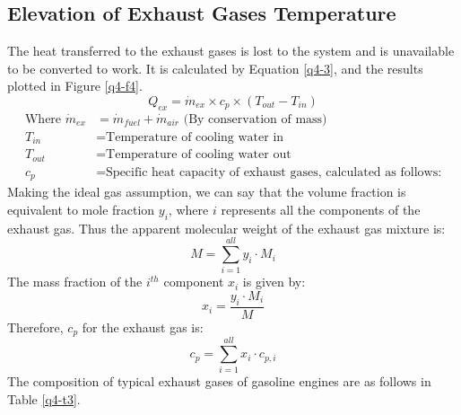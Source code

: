 \documentclass[11pt]{article}
\begin{document}
\subsection*{Elevation of Exhaust Gases Temperature}
The heat transferred to the exhaust gases is lost to the system and is unavailable to be converted to work. It is calculated by Equation \ref{q4-3}, and the results plotted in Figure \ref{q4-f4}.
\begin{equation}
Q_{ex} = \dot{m}_{ex} \times c_p \times (T_{out}-T_{in}) \label{q4-3}
\end{equation}
\begin{align*}
\textrm{Where }
\dot{m}_{ex}	&= \dot{m}_{fuel} + \dot{m}_{air} \textrm{ (By conservation of mass)}\\
T_{in}			&= \textrm{Temperature of cooling water in}\\ 
T_{out}			&= \textrm{Temperature of cooling water out}\\
c_p				&= \textrm{Specific heat capacity of exhaust gases, calculated as follows:}
\end{align*}
Making the ideal gas assumption, we can say that the volume fraction is equivalent to mole fraction $y_i$, where $i$ represents all the components of the exhaust gas. Thus the apparent molecular weight of the exhaust gas mixture is:
\begin{equation}
M = \sum\limits_{i=1}^{all} y_i \cdot M_i \label{q4-4}
\end{equation}
The mass fraction of the $i^{th}$ component $x_i$ is given by:
\begin{equation}
x_i= \frac{y_i \cdot M_i}{M} \label{q4-5}
\end{equation}
Therefore, $c_p$ for the exhaust gas is:
\begin{equation}
c_p = \sum \limits_{i=1}^{all} x_i \cdot c_{p,i} \label{q4-6}
\end{equation}
The composition of typical exhaust gases of gasoline engines are as follows in Table \ref{q4-t3}. \cite{q4-r2} \cite{q4-r3} 
\end{document}
